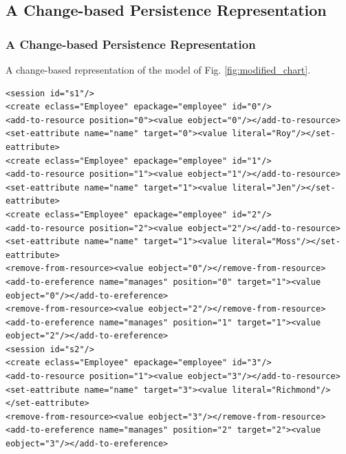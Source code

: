 \documentclass{beamer}
\begin{document}
\begin{frame}[fragile]
\section{A Change-based Persistence Representation}
\frametitle{A Change-based Persistence Representation}
A change-based representation of the model of Fig. \ref{fig:modified_chart}.
\begin{lstlisting}[style=xml,label=lst:cbpmodel]
<session id="s1"/>
<create eclass="Employee" epackage="employee" id="0"/>
<add-to-resource position="0"><value eobject="0"/></add-to-resource>
<set-eattribute name="name" target="0"><value literal="Roy"/></set-eattribute>
<create eclass="Employee" epackage="employee" id="1"/>
<add-to-resource position="1"><value eobject="1"/></add-to-resource>
<set-eattribute name="name" target="1"><value literal="Jen"/></set-eattribute>
<create eclass="Employee" epackage="employee" id="2"/>
<add-to-resource position="2"><value eobject="2"/></add-to-resource>
<set-eattribute name="name" target="1"><value literal="Moss"/></set-eattribute>
<remove-from-resource><value eobject="0"/></remove-from-resource>
<add-to-ereference name="manages" position="0" target="1"><value eobject="0"/></add-to-ereference>
<remove-from-resource><value eobject="2"/></remove-from-resource>
<add-to-ereference name="manages" position="1" target="1"><value eobject="2"/></add-to-ereference>
<session id="s2"/>
<create eclass="Employee" epackage="employee" id="3"/>
<add-to-resource position="1"><value eobject="3"/></add-to-resource>
<set-eattribute name="name" target="3"><value literal="Richmond"/></set-eattribute>
<remove-from-resource><value eobject="3"/></remove-from-resource>
<add-to-ereference name="manages" position="2" target="2"><value eobject="3"/></add-to-ereference>
\end{lstlisting}
\end{frame}
\end{document}
